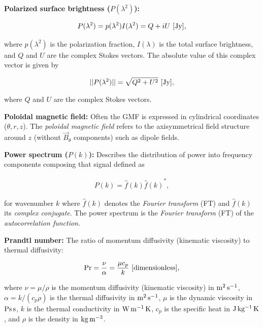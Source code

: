 \documentclass[a4paper,10pt]{article}
\begin{document}
{\noindent}\textbf{Polarized surface brightness ($P(\lambda^2)$):} 

\begin{align*}
    P(\lambda^2) = p(\lambda^2)I(\lambda^2) = Q + iU ~ [{\rm Jy}],
\end{align*}

{\noindent}where $p(\lambda^2)$ is the polarization fraction, $I(\lambda)$ is the total surface brightness, and $Q$ and $U$ are the complex Stokes vectors. The absolute value of this complex vector is given by

\begin{align*}
    \lvert\lvert P(\lambda^2) \rvert\rvert = \sqrt{Q^2 + U^2} ~ [{\rm Jy}],
\end{align*}

{\noindent}where $Q$ and $U$ are the complex Stokes vectors.

{\noindent}\textbf{Poloidal magnetic field:} Often the GMF is expressed in cylindrical coordinates ($\theta, r, z$). The \textit{poloidal magnetic field} refers to the axisymmetrical field structure around $z$ (without $\vec{B}_\theta$ components) such as dipole fields.

{\noindent}\textbf{Power spectrum ($P(k)$):} Describes the distribution of power into frequency components composing that signal defined as

\begin{align*}
    P(k) = \hat{f}(k){\hat{f}(k)}^*,
\end{align*}

{\noindent}for wavenumber $k$ where $\hat{f}(k)$ denotes the \textit{Fourier transform} (FT) and ${\hat{f}(k)}$ its \textit{complex conjugate}. The power spectrum is the \textit{Fourier transform} (FT) of the \textit{autocorrelation function}.

{\noindent}\textbf{Prandtl number:} The ratio of momentum diffusivity (kinematic viscosity) to thermal diffusivity:

\begin{align*}
    {\rm Pr} = \frac{\nu}{\alpha} = \frac{\mu c_p}{k} ~ [{\rm dimensionless}],
\end{align*}

{\noindent}where $\nu=\mu/\rho$ is the momentum diffusivity (kinematic viscosity) in ${\rm m^2\,s^{-1}}$, $\alpha=k/(c_p\rho)$ is the thermal diffusivity in ${\rm m^2\,s^{-1}}$, $\mu$ is the dynamic viscosity in ${\rm Ps\,s}$, $k$ is the thermal conductivity in ${\rm W\,m^{-1}\,K}$, $c_p$ is the specific heat in ${\rm J\,kg^{-1}\,K}$, and $\rho$ is the density in ${\rm kg\,m^{-3}}$.
\end{document}
